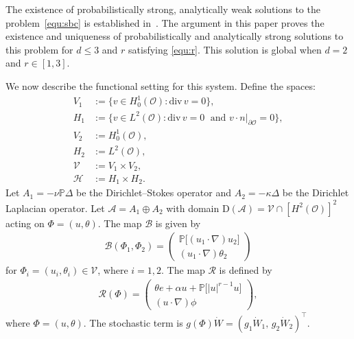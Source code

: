 \documentclass[11pt, reqno]{amsart}
\theoremstyle{definition}
\numberwithin{equation}{section}
\newcommand{\bb}{\mathbb}
\newcommand{\divg}{\mathrm{div}\,}
\begin{document}
The existence of probabilistically strong, analytically weak solutions to the problem~\eqref{equ:sbc} is established in~\cite{ChuMil10}. The argument in this paper proves the existence and uniqueness of probabilistically and analytically strong solutions to this problem for $d\leq 3$ and $r$ satisfying \eqref{equ:r}. This solution is global when $d=2$ and $r\in [1,3]$.

We now describe the functional setting for this system. Define the spaces:
\begin{align*}
    V_1 &:= \{v\in H^1_0(\mathscr{O}): \divg v=0\},
    \\
    H_1 &:= \{v\in L^2(\mathscr{O}): \divg v=0 \;\text{ and } \left. v\cdot n \right|_{\partial \mathscr{O}}= 0\},
    \\
    V_2 &:= H^1_0(\mathscr{O}),
    \\
    H_2 &:= L^2(\mathscr{O}),
    \\
    \mathcal{V} &:= V_1 \times V_2,
    \\
    \mathcal{H} &:= H_1 \times H_2.
\end{align*}
Let $A_1= -\nu \bb{P}\Delta$ be the Dirichlet--Stokes operator and $A_2=-\kappa\Delta$ be the Dirichlet Laplacian operator. Let $\mathcal{A}= A_1 \oplus A_2$ with domain $\mathrm{D}(\mathcal{A})= \mathcal{V} \cap \left[H^2(\mathscr{O})\right]^2$ acting on $\Phi=(u,\theta)$. The map $\mathcal{B}$ is given by
\begin{align*}
    \mathcal{B}(\Phi_1,\Phi_2)= 
    \begin{pmatrix} \bb{P}\big[(u_1\cdot\nabla)u_2\big] \\[0.5ex] (u_1\cdot\nabla)\theta_2 \end{pmatrix}
\end{align*}
for $\Phi_i=(u_i,\theta_i)\in \mathcal{V}$, where $i=1,2$. The map $\mathcal{R}$ is defined by
\begin{align*}
    \mathcal{R}(\Phi)= 
    \begin{pmatrix} \theta e+ \alpha u + \bb{P}\big[|u|^{r-1} u\big] \\[0.5ex] (u\cdot\nabla) \phi \end{pmatrix},
\end{align*}
where $\Phi=(u,\theta)$. The stochastic term is $g(\Phi)\dot{W}= (g_1\dot{W}_1,\, g_2\dot{W}_2)^\top$. 
\end{document}
